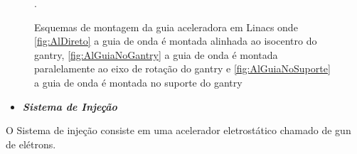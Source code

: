 \documentclass[11pt,a4paper]{article}
\begin{document}
            \begin{figure}[h]
                \centering
                \caption{Esquemas de montagem da guia aceleradora em Linacs onde \ref{fig:AlDireto} a guia de onda é montada alinhada ao isocentro do gantry, \ref{fig:AlGuiaNoGantry} a guia de onda é montada paralelamente ao eixo de rotação do gantry e \ref{fig:AlGuiaNoSuporte} a guia de onda é montada no suporte do gantry}.
                \label{fig:esquemasMontagemGuia}
            \end{figure}

                \begin{itemize}
                    \item \textbf{\textit{\textcolor{CarnationPink}{Sistema de Injeção}}}
                \end{itemize}

                    O Sistema de injeção consiste em uma acelerador eletrostático chamado de gun de elétrons.
\end{document}
